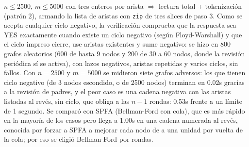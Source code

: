  $n \le 2500$, $m \le 5000$ con tres enteros por arista $\Rightarrow$ lectura total + tokenización (patrón 2), armando la lista de aristas con \texttt{zip} de tres slices de paso 3. Como se acepta cualquier ciclo negativo, la verificación comprueba que la respuesta sea YES exactamente cuando existe un ciclo negativo (según Floyd-Warshall) y que el ciclo impreso cierre, use aristas existentes y sume negativo: se hizo en 800 grafos aleatorios (600 de hasta 9 nodos y 200 de 30 a 60 nodos, donde la revisión periódica sí se activa), con lazos negativos, aristas repetidas y varios ciclos, sin fallos. Con $n = 2500$ y $m = 5000$ se midieron siete grafos adversos: los que tienen ciclo negativo (de 3 nodos escondido, o de 2500 nodos) terminan en \aprox{}0.02s gracias a la revisión de padres, y el peor caso es una cadena negativa con las aristas listadas al revés, sin ciclo, que obliga a las $n-1$ rondas: \aprox{}0.53s frente a un límite de 1 segundo. Se comparó con SPFA (Bellman-Ford con cola), que es más rápido en la mayoría de los casos pero llega a \aprox{}1.00s en una cadena numerada al revés, conocida por forzar a SPFA a mejorar cada nodo de a una unidad por vuelta de la cola; por eso se eligió Bellman-Ford por rondas.


